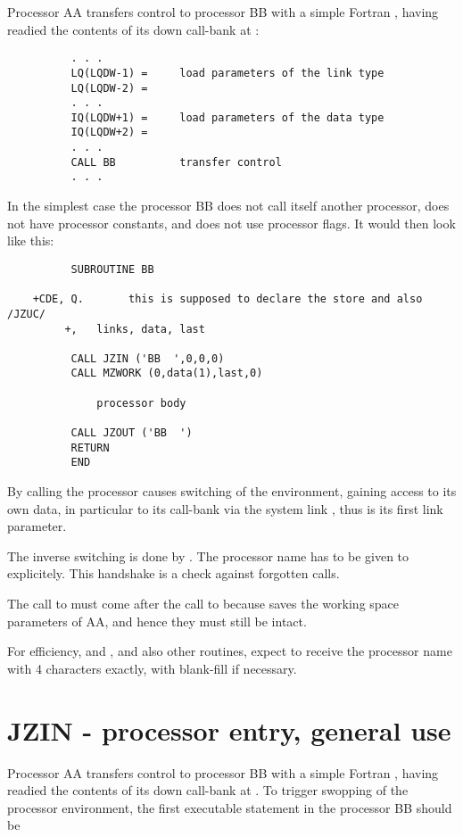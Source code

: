 Processor AA transfers control to processor BB with
a simple Fortran ,
having readied the contents of its down call-bank
at :
\begin{verbatim}
          . . .
          LQ(LQDW-1) =     load parameters of the link type
          LQ(LQDW-2) =
          . . .
          IQ(LQDW+1) =     load parameters of the data type
          IQ(LQDW+2) =
          . . .
          CALL BB          transfer control
          . . .
\end{verbatim} 
In the simplest case the processor BB does
not call itself another processor,
does not have processor constants,
and does not use processor flags.
It would then look like this:
\begin{verbatim}
          SUBROUTINE BB

    +CDE, Q.       this is supposed to declare the store and also /JZUC/
         +,   links, data, last

          CALL JZIN ('BB  ',0,0,0)
          CALL MZWORK (0,data(1),last,0)

              processor body

          CALL JZOUT ('BB  ')
          RETURN
          END
\end{verbatim} 
By calling  the processor causes switching of the environment,
gaining access to its own data,
in particular to its call-bank via the system link ,
thus  is its first link parameter.

The inverse switching is done by .
The processor name has to be given to  explicitely.
This handshake is a check against forgotten calls.

The call to  must come after the call to 
because  saves the working space parameters of AA,
and hence they must still be intact.

For efficiency,  and , and also other routines,
expect to receive the processor name with 4 characters exactly,
with blank-fill if necessary.

\newpage
{}
\section{JZIN - processor entry, general use}
\label{sec:JZbasicJZIN}

Processor AA transfers control to processor BB with
a simple Fortran ,
having readied the contents of its down call-bank
at .
To trigger swopping of the processor environment,
the first executable statement in the processor BB should be

